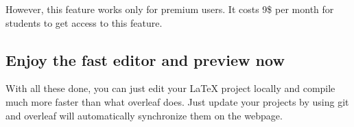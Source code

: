 However, this feature works only for premium users. It costs 9\$ per month for students to get access to this feature.

\subsection*{Enjoy the fast editor and preview now}

With all these done, you can just edit your LaTeX project locally and compile much more faster than what overleaf does. Just update your projects by using git and overleaf will automatically synchronize them on the webpage.

